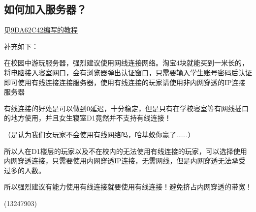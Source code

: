 \documentclass[UTF8,a4paper]{article}
\begin{document}
		\subsection{如何加入服务器？}
			\par 见\hyperlink{howtologinin}{9DA62C42编写的教程}
			\par 补充如下：
			\par 在校园中游玩服务器，强烈建议使用网线连接网络。淘宝4块就能买到一米长的，将电脑接入寝室网口，会有浏览器弹出认证窗口，只需要输入学生账号密码后认证即可使用有线连接连接服务器，使用有线连接的玩家请使用非内网穿透的IP连接服务器
			\par 有线连接的好处是可以做到0延迟，十分稳定，但是只有在学校寝室等有网线插口的地方使用，并且女生寝室D1竟然并不支持有线连接！
			\par （是认为我们女玩家不会使用有线网络吗，哈基蚁你赢了......）
			\par 所以人在D1楼层的玩家以及不在校内的无法使用有线连接的玩家，可以选择使用内网穿透连接，只需要使用内网穿透IP连接，无需网线，但是内网穿透无法承受过多的人数。
			\par 所以强烈建议有能力使用有线连接就要使用有线连接！避免挤占内网穿透的带宽！
			\begin{flushright}(13247903)\end{flushright}
\end{document}
